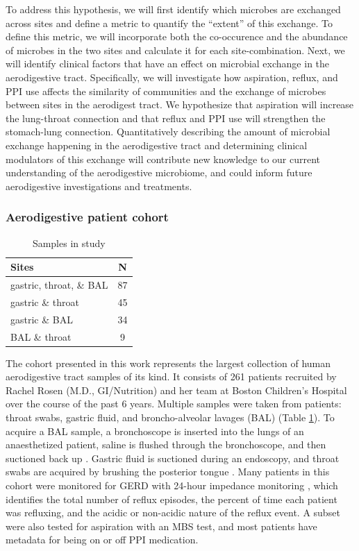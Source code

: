 \documentclass[12pt]{article}
\begin{document}
To address this hypothesis, we will first identify which microbes
are exchanged across sites and define a metric to quantify the ``extent'' of this exchange. 
To define this metric, we will incorporate both the co-occurence and the abundance
of microbes in the two sites and calculate it for each site-combination.
Next, we will identify clinical factors that have an effect on microbial
exchange in the aerodigestive tract. Specifically, we will investigate how aspiration,
reflux, and PPI use affects the similarity of communities and the
exchange of microbes between sites in the aerodigest tract.
We hypothesize that aspiration will increase the lung-throat connection and 
that reflux and PPI use will strengthen the stomach-lung connection.
Quantitatively describing the amount of microbial exchange happening in the
aerodigestive tract and determining clinical modulators of this exchange
will contribute new knowledge to our current understanding of the
aerodigestive microbiome, and could inform future aerodigestive
investigations and treatments.

\subsubsection{Aerodigestive patient cohort}

\begin{table}
\begin{tabular}{l c}
	\hline
	\textbf{Sites} & \textbf{N} \\
	\hline
	gastric, throat, \& BAL & 87 \\
	gastric \& throat & 45 \\
	gastric \& BAL & 34 \\
	BAL \& throat & 9 \\
	\hline 
\end{tabular}
\caption{Samples in study}\label{tab:rosen_samples}
\end{table}

The cohort presented in this work represents the largest collection of 
human aerodigestive tract samples of its kind.
It consists of 261 patients recruited by Rachel Rosen 
(M.D., GI/Nutrition) and her team at Boston Children's Hospital  
over the course of the past 6 years. Multiple samples were 
taken from patients: throat swabs, gastric fluid, and broncho-alveolar lavages (BAL) (Table \ref{tab:rosen_samples}). 
To acquire a BAL sample, a bronchoscope is inserted into the lungs 
of an anaesthetized patient, saline is flushed through the 
bronchoscope, and then suctioned back up \cite{charslon-topographical-2011}. 
Gastric fluid is suctioned during an endoscopy, and throat
swabs are acquired by brushing the posterior tongue \cite{rosen-ppi-2015}. 
Many patients in this cohort were monitored for GERD with 24-hour
impedance monitoring \cite{vakil-gerd_defn-2006}, which identifies the total number of reflux episodes,
the percent of time each patient was refluxing, and the acidic or non-acidic
nature of the reflux event. A subset were also tested for aspiration with
an MBS test, and most patients have metadata for being on or off PPI medication.
\end{document}
